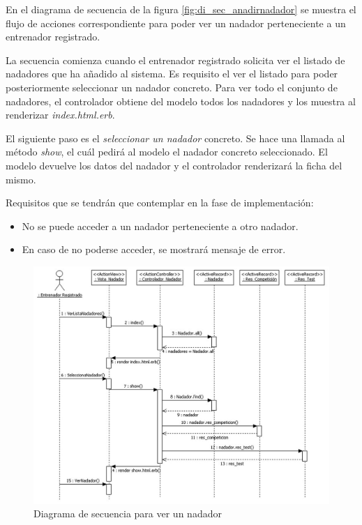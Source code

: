 			En el diagrama de secuencia de la figura \ref{fig:di_sec_anadirnadador} se muestra el flujo de acciones correspondiente para poder ver un nadador perteneciente a un entrenador registrado.
			
			La secuencia comienza cuando el entrenador registrado solicita ver el listado de nadadores que ha añadido al sistema. Es requisito el ver el listado para poder posteriormente seleccionar un nadador concreto. Para ver todo el conjunto de nadadores, el controlador obtiene del modelo todos los nadadores y los muestra al renderizar {\it index.html.erb}. 
			
			El siguiente paso es el {\it seleccionar un nadador} concreto. Se hace una llamada al método {\it show}, el cuál pedirá al modelo el nadador concreto seleccionado. El modelo devuelve los datos del nadador y el controlador renderizará la ficha del mismo.
			
			Requisitos que se tendrán que contemplar en la fase de implementación:
			
			\begin{itemize}
			 \item No se puede acceder a un nadador perteneciente a otro nadador.
			 \item En caso de no poderse acceder, se mostrará mensaje de error.
			\end{itemize}
			
			\begin{figure}[H]
			  \centering
			    \includegraphics[width=15cm]{./eps/di_diagsecuencia/Nadador_Ver.eps}
			  \caption{Diagrama de secuencia para ver un nadador}
			  \label{fig:di_sec_vernadador}
			\end{figure}
		
